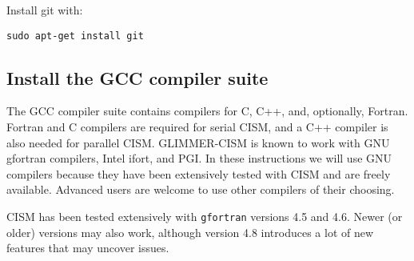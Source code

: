 \begin{mdframed}[style=ubuntu] %
Install git with:

\texttt{sudo apt-get install git}
\end{mdframed}                 %


\subsection{Install the GCC compiler suite}

The GCC compiler suite contains compilers for C, C++, and, optionally, Fortran.
Fortran and C compilers are required for serial CISM, and a C++ compiler is also
needed for parallel CISM.  GLIMMER-CISM is known to work with GNU gfortran compilers, 
Intel ifort, and PGI.  In these instructions we will use GNU compilers because they
have been extensively tested with CISM and are freely available.  Advanced users
are welcome to use other compilers of their choosing.

CISM has been tested extensively with \texttt{gfortran} versions 4.5 and 4.6.
Newer (or older) versions may also work, although version 4.8 introduces a lot of 
new features that may uncover issues.

